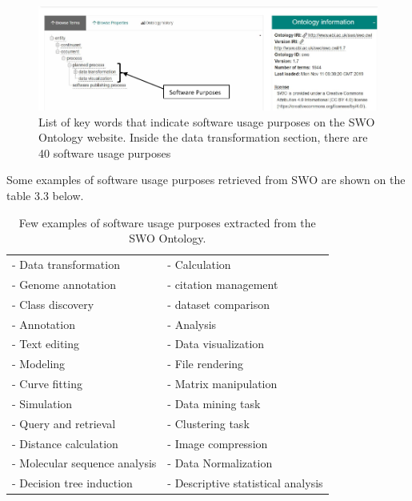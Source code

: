 \begin{figure}[htbp]
	\centering
	\includegraphics[width=.99\textwidth]{4.graphics/figures/SWO2}
	\caption{List of key words that indicate software usage purposes on the SWO Ontology website. Inside the data transformation section, there are 40 software usage purposes}
	\label{fig:chapter03:setup}
\end{figure}

Some examples of software usage purposes retrieved from SWO are shown on the table 3.3 below.

\begin{table}[h!]
	\begin{center}
		\caption{Few examples of software usage purposes extracted from the SWO Ontology.}
		\label{tab:table1}
		\begin{tabular}{|l|l|} %
			
			\hline
			- Data transformation & - Calculation  \\
			- Genome annotation   & - citation management  \\
			- Class discovery     & - dataset comparison   \\
			- Annotation          & - Analysis \\
			- Text editing        & - Data visualization  \\
			- Modeling           & - File rendering   \\
			- Curve fitting       & - Matrix manipulation  \\
			- Simulation          & - Data mining task   \\
			- Query and retrieval & - Clustering task \\
			- Distance calculation & - Image compression \\
			- Molecular sequence analysis & - Data Normalization \\
			- Decision tree induction & - Descriptive statistical analysis \\
			
			\hline
		\end{tabular}
	\end{center}
\end{table}


